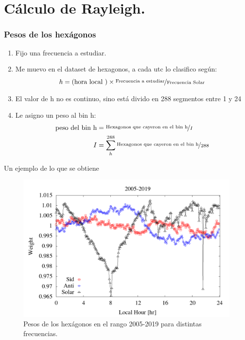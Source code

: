 \section{Cálculo de Rayleigh.}

  \subsubsection{Pesos de los hexágonos}

      \begin{enumerate}
        \item Fijo una frecuencia a estudiar.
        \item Me muevo en el dataset de hexagonos, a cada utc lo clasifico según:
        \begin{equation*}
          h = (\text{hora local })\times \nicefrac{\text{Frecuencia a estudiar}}{\text{Frecuencia Solar}}
        \end{equation*}
          \item El valor de h no es continuo, sino está divido en 288 segmentos entre 1 y 24
       \item Le asigno un peso al bin h:
        \begin{align*}
          \text{peso del bin h} &= \nicefrac{\text{Hexagonos que cayeron en el bin h}}{I}\\
          I &= \sum^{288}_h \nicefrac{\text{Hexagonos que cayeron en el bin h}}{288}
         \end{align*} 
      \end{enumerate}

      Un ejemplo de lo que se obtiene


        \begin{figure}[H]
          \centering
              \includegraphics[width=0.85\linewidth]{../report_2_27_04_2020/weigth2005-2019.png}
              \caption{Pesos de los hexágonos en el rango 2005-2019 para distintas frecuencias.}
        \end{figure}

